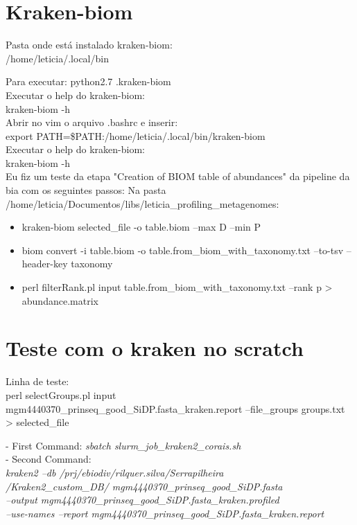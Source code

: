 \documentclass[12pt, a4paper]{report}
\begin{document}
\section{Kraken-biom}
Pasta onde está instalado kraken-biom: \\
/home/leticia/.local/bin

Para executar:
python2.7 .\/kraken-biom \\

Executar o help do kraken-biom: \\
kraken-biom -h \\

Abrir no vim o arquivo .bashrc e inserir: \\
export PATH=\$PATH:/home/leticia/.local/bin/kraken-biom \\

Executar o help do kraken-biom: \\
kraken-biom -h \\

 
Eu fiz um teste da etapa "Creation of BIOM table of abundances" da pipeline da bia com os seguintes passos:
Na pasta\: 
 /home/leticia/Documentos/libs/leticia\_profiling\_metagenomes: 

\begin{itemize}
\item kraken-biom selected\_file -o table.biom --max D --min P 
\item biom convert -i table.biom -o table.from\_biom\_with\_taxonomy.txt --to-tsv --header-key taxonomy 
\item perl filterRank.pl \-\-input table.from\_biom\_with\_taxonomy.txt --rank p > abundance.matrix 
\end{itemize}

\section{Teste com o kraken no scratch}
Linha de teste: \\
perl selectGroups.pl \-\-input mgm4440370\_prinseq\_good\_SiDP.fasta\_kraken.report --file\_groups groups.txt > selected\_file


\begin{tcolorbox}[width=6.3in]
- First Command: \textit{sbatch slurm\_job\_kraken2\_corais.sh}\\
- Second Command: \textit{\\
kraken2 --db /prj/ebiodiv/rilquer.silva/Serrapilheira \\
/Kraken2\_custom\_DB/ mgm4440370\_prinseq\_good\_SiDP.fasta \\
--output mgm4440370\_prinseq\_good\_SiDP.fasta\_kraken.profiled \\
--use-names --report mgm4440370\_prinseq\_good\_SiDP.fasta\_kraken.report}
\end{tcolorbox}
\end{document}
